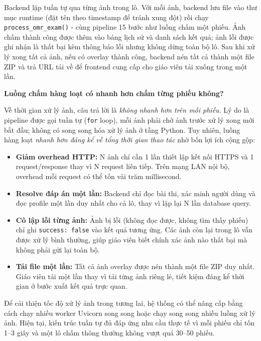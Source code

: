 Backend lặp tuần tự qua từng ảnh trong lô. Với mỗi ảnh, backend lưu file vào thư mục runtime (đặt tên theo timestamp để tránh xung đột) rồi chạy \texttt{process\_omr\_exam()} - cùng pipeline 15 bước như luồng chấm một phiếu. Ảnh chấm thành công được thêm vào bảng lịch sử và danh sách kết quả; ảnh lỗi được ghi nhận là thất bại kèm thông báo lỗi nhưng không dừng toàn bộ lô. Sau khi xử lý xong tất cả ảnh, nếu có overlay thành công, backend nén tất cả thành một file ZIP và trả URL tải về để frontend cung cấp cho giáo viên tải xuống trong một lần.

\textbf{Luồng chấm hàng loạt có nhanh hơn chấm từng phiếu không?}

Về thời gian xử lý ảnh, câu trả lời là \textit{không nhanh hơn trên mỗi phiếu}. Lý do là pipeline được gọi tuần tự (\texttt{for} loop), mỗi ảnh phải chờ ảnh trước xử lý xong mới bắt đầu; không có song song hóa xử lý ảnh ở tầng Python. Tuy nhiên, luồng hàng loạt \textit{nhanh hơn đáng kể về tổng thời gian thao tác} nhờ bốn lợi ích cộng gộp:

\begin{itemize}[leftmargin=1.5cm]
  \item \textbf{Giảm overhead HTTP:} N ảnh chỉ cần 1 lần thiết lập kết nối HTTPS và 1 request/response thay vì N request liên tiếp. Trên mạng LAN nội bộ, overhead mỗi request có thể tốn vài trăm millisecond.
  \item \textbf{Resolve đáp án một lần:} Backend chỉ đọc bài thi, xác minh người dùng và đọc profile một lần duy nhất cho cả lô, thay vì lặp lại N lần database query.
  \item \textbf{Cô lập lỗi từng ảnh:} Ảnh bị lỗi (không đọc được, không tìm thấy phiếu) chỉ ghi \texttt{success: false} vào kết quả tương ứng. Các ảnh còn lại trong lô vẫn được xử lý bình thường, giúp giáo viên biết chính xác ảnh nào thất bại mà không phải gửi lại toàn bộ.
  \item \textbf{Tải file một lần:} Tất cả ảnh overlay được nén thành một file ZIP duy nhất. Giáo viên tải một lần thay vì tải từng ảnh riêng lẻ, tiết kiệm đáng kể thời gian ở bước xuất kết quả trực quan.
\end{itemize}

Để cải thiện tốc độ xử lý ảnh trong tương lai, hệ thống có thể nâng cấp bằng cách chạy nhiều worker Uvicorn song song hoặc chạy song song nhiều luồng xử lý ảnh. Hiện tại, kiến trúc tuần tự đủ đáp ứng nhu cầu thực tế vì mỗi phiếu chỉ tốn 1--3 giây và một lô chấm thông thường không vượt quá 30--50 phiếu.

